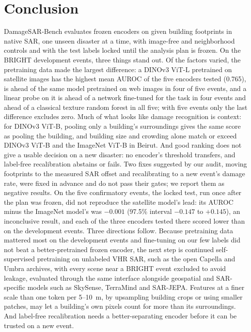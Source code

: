\documentclass{ieeeaccess}
\begin{document}
\section{Conclusion}
\label{sec:conclusion}
DamageSAR-Bench evaluates frozen encoders on given building footprints in native SAR, one unseen disaster at a time, with image-free and neighborhood controls and with the test labels locked until the analysis plan is frozen. On the BRIGHT development events, three things stand out. Of the factors varied, the pretraining data made the largest difference: a DINOv3 ViT-L pretrained on satellite images has the highest mean AUROC of the five encoders tested (0.765), is ahead of the same model pretrained on web images in four of five events, and a linear probe on it is ahead of a network fine-tuned for the task in four events and ahead of a classical texture random forest in all five; with five events only the last difference excludes zero. Much of what looks like damage recognition is context: for DINOv3 ViT-B, pooling only a building's surroundings gives the same score as pooling the building, and building size and crowding alone match or exceed DINOv3 ViT-B and the ImageNet ViT-B in Beirut. And good ranking does not give a usable decision on a new disaster: no encoder's threshold transfers, and label-free recalibration abstains or fails. Two fixes suggested by our audit, moving footprints to the measured SAR offset and recalibrating to a new event's damage rate, were fixed in advance and do not pass their gates; we report them as negative results. On the five confirmatory events, the locked test, run once after the plan was frozen, did not reproduce the satellite model's lead: its AUROC minus the ImageNet model's was $-0.001$ (97.5\% interval $-0.147$ to $+0.145$), an inconclusive result, and each of the three encoders tested there scored lower than on the development events. Three directions follow. Because pretraining data mattered most on the development events and fine-tuning on our few labels did not beat a better-pretrained frozen encoder, the next step is continued self-supervised pretraining on unlabeled VHR SAR, such as the open Capella and Umbra archives, with every scene near a BRIGHT event excluded to avoid leakage, evaluated through the same interface alongside geospatial and SAR-specific models such as SkySense, TerraMind and SAR-JEPA. Features at a finer scale than one token per 5--10~m, by upsampling building crops or using smaller patches, may let a building's own pixels count for more than its surroundings. And label-free recalibration needs a better-separating encoder before it can be trusted on a new event.
\end{document}
